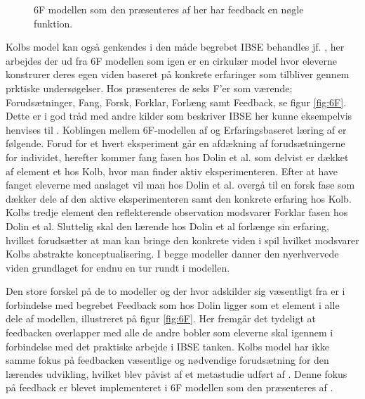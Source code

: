 \begin{wrapfigure}{o}{.5\textwidth}
	\centering
	\vspace{-20pt}
	\caption{6F modellen som den præsenteres af \citep{Dolin2014} her har feedback en nøgle funktion. }
	\label{fig:6F}
\vspace{-20pt}
\end{wrapfigure}
Kolbs model kan også genkendes i den måde begrebet IBSE behandles jf. \citep{Dolin2014}, her arbejdes der ud fra 6F modellen som igen er en  cirkulær model hvor eleverne konstrurer deres egen viden baseret på konkrete erfaringer som tilbliver gennem prktiske undersøgelser. Hos \citet{Dolin2014} præsenteres de seks F'er som værende; Forudsætninger, Fang, Forsk, Forklar, Forlæng samt Feedback, se figur \vref{fig:6F}. Dette er i god tråd med andre kilder som beskriver IBSE her kunne eksempelvis henvises til \citep{Krogh2016}.
Koblingen mellem 6F-modellen af \citep{Dolin2014} og Erfaringsbaseret læring af \citep{Kolb1984} er følgende. Forud for et hvert eksperiment går en afdækning af forudsætningerne for individet, herefter kommer fang fasen hos Dolin et al. som delvist er dækket af element et hos Kolb, hvor man finder aktiv eksperimenteren. Efter at have fanget eleverne med anslaget vil man hos Dolin et al. overgå til en forsk fase som dækker dele af den aktive eksperimenteren samt den konkrete erfaring hos Kolb. Kolbs tredje element den reflekterende observation modsvarer Forklar fasen hos Dolin et al. Sluttelig skal den lærende hos Dolin et al forlænge sin erfaring, hvilket forudsætter at man kan bringe den konkrete viden i spil hvilket modsvarer Kolbs abstrakte konceptualisering. I begge modeller danner den nyerhvervede viden grundlaget for endnu en tur rundt i modellen.

Den store forskel på de to modeller og der hvor \citet{Dolin2014} adskilder sig væsentligt fra \citet{Kolb1984} er i forbindelse med begrebet Feedback som hos Dolin ligger som et element i alle dele af modellen, illustreret på figur \vref{fig:6F}. Her fremgår det tydeligt at feedbacken overlapper med alle de andre bobler som eleverne skal igennem i forbindelse med det praktiske arbejde i IBSE tanken. Kolbs model har ikke samme fokus på feedbacken væsentlige og nødvendige forudsætning for den lærendes udvikling, hvilket blev påvist af et metastudie udført af \citep{Hattie2015}. Denne fokus på feedback er blevet implementeret i 6F modellen som den præsenteres af \citep{Dolin2014}.


